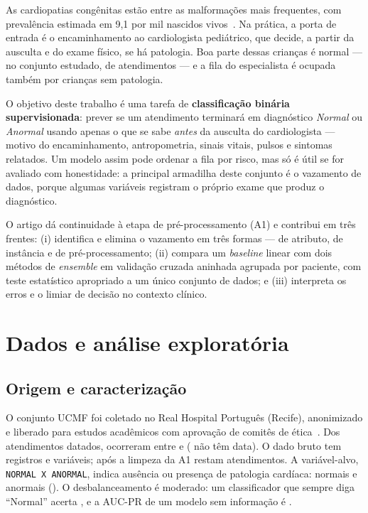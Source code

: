 \documentclass[conference,a4paper]{IEEEtran}
\begin{document}
As cardiopatias congênitas estão entre as malformações mais frequentes, com prevalência estimada em 9,1 por mil nascidos vivos~\cite{vanderlinde2011}. Na prática, a porta de entrada é o encaminhamento ao cardiologista pediátrico, que decide, a partir da ausculta e do exame físico, se há patologia. Boa parte dessas crianças é normal --- no conjunto estudado,  de  atendimentos --- e a fila do especialista é ocupada também por crianças sem patologia.

O objetivo deste trabalho é uma tarefa de \textbf{classificação binária supervisionada}: prever se um atendimento terminará em diagnóstico \emph{Normal} ou \emph{Anormal} usando apenas o que se sabe \emph{antes} da ausculta do cardiologista --- motivo do encaminhamento, antropometria, sinais vitais, pulsos e sintomas relatados. Um modelo assim pode ordenar a fila por risco, mas só é útil se for avaliado com honestidade: a principal armadilha deste conjunto é o vazamento de dados, porque algumas variáveis registram o próprio exame que produz o diagnóstico.

O artigo dá continuidade à etapa de pré-processamento (A1) e contribui em três frentes: (i) identifica e elimina o vazamento em três formas --- de atributo, de instância e de pré-processamento; (ii) compara um \textit{baseline} linear com dois métodos de \textit{ensemble} em validação cruzada aninhada agrupada por paciente, com teste estatístico apropriado a um único conjunto de dados; e (iii) interpreta os erros e o limiar de decisão no contexto clínico.

\section{Dados e análise exploratória}

\subsection{Origem e caracterização}

O conjunto UCMF foi coletado no Real Hospital Português (Recife), anonimizado e liberado para estudos acadêmicos com aprovação de comitês de ética~\cite{dicionario_ucmf}. Dos atendimentos datados,  ocorreram entre  e  ( não têm data). O dado bruto tem  registros e  variáveis; após a limpeza da A1 restam  atendimentos. A variável-alvo, \texttt{NORMAL X ANORMAL}, indica ausência ou presença de patologia cardíaca:  normais e  anormais (). O desbalanceamento é moderado: um classificador que sempre diga ``Normal'' acerta , e a AUC-PR de um modelo sem informação é .
\end{document}
